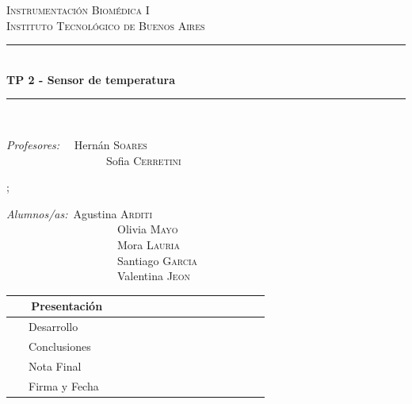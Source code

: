 \documentclass[10pt]{article}
\newcommand{\HRule}{\rule{\linewidth}{0.5mm}}
\begin{document}
\begin{center}


\textsc{\LARGE Instrumentación Biomédica I}\\[0.2cm]
\textsc{\Large Instituto Tecnológico de Buenos Aires}\\[0.2cm]

\HRule\\[0.2cm]
{ \huge \bfseries  TP 2 - Sensor de temperatura \\[0.2cm] }
\HRule\\[1cm]

\begin{multicols}{2}

{\raggedright{}
\large
\emph{Profesores:} \ \  Hernán   \textsc{Soares}\\

\ \ \ \ \ \ \ \ \ \ \ \ \ \ \ \ \ \  Sofia \textsc{Cerretini} \\
}

\columnbreak;
{\raggedright{}
\large
\emph{Alumnos/as:}\  Agustina  \textsc{Arditi} \\
\ \ \ \ \ \ \ \ \ \ \ \ \ \ \ \ \ \ \ \ Olivia  \textsc{Mayo}\\
\  \ \ \ \ \ \ \ \ \ \ \ \ \ \ \ \ \ \ \ Mora  \textsc{Lauria}\\
\ \ \ \ \ \ \ \ \ \ \ \ \ \ \ \ \ \ \ \ Santiago \textsc{Garcia} \\
\ \ \ \ \ \ \ \ \ \ \ \ \ \ \ \ \ \ \ \ Valentina \textsc{Jeon} \\
}
\end{multicols}

\vspace{0.5cm}

\begin{adjustbox}{max width=\textwidth}

\tabulinesep=1.8mm

  \begin{tabu}{|  l | c |}
    \hline
     \ \ \ Presentación  &       \ \ \  \ \ \  \ \ \   \ \ \ \ \ \  \\ \hline
     \ \ \ Desarrollo &  \\ \hline
     \ \ \ Conclusiones &   \\ \hline
    \ \ \  Nota Final &  \\ \hline \hline
     \ \ \  Firma y Fecha  \ \ \ \ \ \ \ \ \ &   \\
    \hline
  \end{tabu}
\end{adjustbox}

\end{center}
\end{document}
